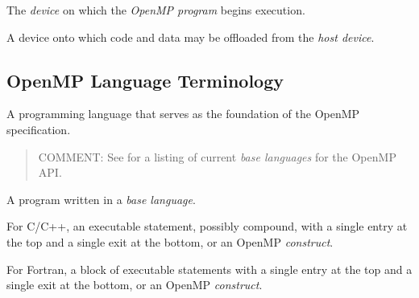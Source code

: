 \glossarydefstart
The \emph{device} on which the \emph{OpenMP program} begins execution.
\glossarydefend

\glossarydefstart
A device onto which code and data may be offloaded from the \emph{host device}.
\glossarydefend





\subsection{OpenMP Language Terminology}
\label{subsec:OpenMP Language Terminology}
\glossarydefstart
A programming language that serves as the foundation of the OpenMP 
specification.

\begin{quote}
COMMENT: See 
for a listing of current \emph{base languages} for the OpenMP API.
\end{quote}
\glossarydefend

\glossarydefstart
A program written in a \emph{base language}.
\glossarydefend

\glossarydefstart
For C/C++, an executable statement, possibly compound, with a single entry at the 
top and a single exit at the bottom, or an OpenMP \emph{construct}.

For Fortran, a block of executable statements with a single entry at the top and a 
single exit at the bottom, or an OpenMP \emph{construct}.


